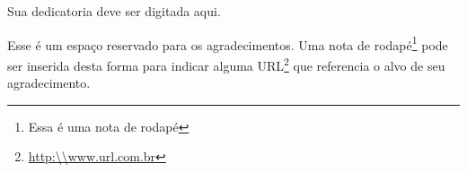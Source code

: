 \documentclass[
  12pt,		%
  a4paper,	%
  openright,%
  oneside,	%
  chapter=TITLE,		%
  section=TITLE,		%
  english,	%
  french,	%
  spanish,	%
  brazil	%
]{abntex2}
\begin{document}
    \begin{dedicatoria}
        \vspace*{\fill}
        \begin{flushright}
            Sua dedicatoria deve ser digitada aqui.
        \end{flushright}
        \vspace*{1cm}
    \end{dedicatoria}

    \begin{agradecimentos}
    
        Esse é um espaço reservado para os agradecimentos. Uma nota de rodapé\footnote{Essa é uma nota de rodapé} pode ser inserida desta forma para indicar alguma URL\footnote{\url{http:\\www.url.com.br}} que referencia o alvo de seu agradecimento.
    
    \end{agradecimentos}
    
    
\end{document}

